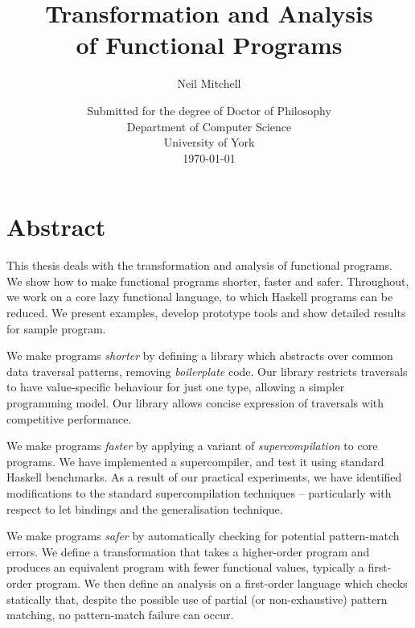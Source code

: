 
\title{Transformation and Analysis \\ of Functional Programs}
\author{Neil Mitchell}
\date{\normalsize{
    \vspace{20mm}
    Submitted for the degree of Doctor of Philosophy \\
    \vspace{10mm}
    Department of Computer Science \\
    University of York \\
    \today}}

\maketitle

\setcounter{page}{2}

\chapter*{Abstract}

This thesis deals with the transformation and analysis of functional programs. We show how to make functional programs shorter, faster and safer. Throughout, we work on a core lazy functional language, to which Haskell programs can be reduced. We present examples, develop prototype tools and show detailed results for sample program.

We make programs \textit{shorter} by defining a library which abstracts over common data traversal patterns, removing \textit{boilerplate} code. Our library restricts traversals to have value-specific behaviour for just one type, allowing a simpler programming model. Our library allows concise expression of traversals with competitive performance.

We make programs \textit{faster} by applying a variant of \textit{supercompilation} to core programs. We have implemented a supercompiler, and test it using standard Haskell benchmarks. As a result of our practical experiments, we have identified modifications to the standard supercompilation techniques -- particularly with respect to let bindings and the generalisation technique.

We make programs \textit{safer} by automatically checking for potential pattern-match errors. We define a transformation that takes a higher-order program and produces an equivalent program with fewer functional values, typically a first-order program. We then define an analysis on a first-order language which checks statically that, despite the possible use of partial (or non-exhaustive) pattern matching, no pattern-match failure can occur.


